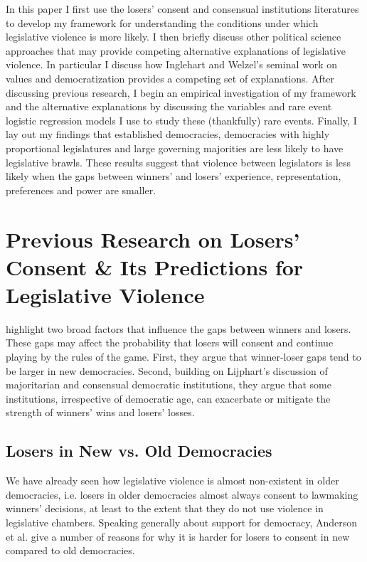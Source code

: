 \documentclass[a4paper]{article}\usepackage{graphicx, color}
\begin{document}
In this paper I first use the losers' consent and consensual institutions literatures to develop my framework for understanding the conditions under which legislative violence is more likely. I then briefly discuss other political science approaches that may provide competing alternative explanations of legislative violence. In particular I discuss how Inglehart and Welzel's \citep{Inglehart1988, Inglehart2005, Inglehart2010} seminal work on values and democratization provides a competing set of explanations. After discussing previous research, I begin an empirical investigation of my framework and the alternative explanations by discussing the variables and rare event logistic regression models \citep{KingRareEvents2001, KingRareEventsPA2001} I use to study these (thankfully) rare events. Finally, I lay out my findings that established democracies, democracies with highly proportional legislatures and large governing majorities are less likely to have legislative brawls. These results suggest that violence between legislators is less likely when the gaps between winners' and losers' experience, representation, preferences and power are smaller.


\section{Previous Research on Losers' Consent \& Its Predictions for Legislative Violence}

\cite{Anderson2005} highlight two broad factors that influence the gaps between winners and losers. These gaps may affect the probability that losers will consent and continue playing by the rules of the game. First, they argue that winner-loser gaps tend to be larger in new democracies. Second, building on Lijphart's discussion of majoritarian and consensual democratic institutions, they argue that some institutions, irrespective of democratic age, can exacerbate or mitigate the strength of winners' wins and losers' losses.

\subsection{Losers in New vs. Old Democracies}

We have already seen how legislative violence is almost non-existent in older democracies, i.e. losers in older democracies almost always consent to lawmaking winners' decisions, at least to the extent that they do not use violence in legislative chambers. Speaking generally about support for democracy, Anderson et al. \citeyearpar[Chapter 6]{Anderson2005} give a number of reasons for why it is harder for losers to consent in new compared to old democracies. 
\end{document}
